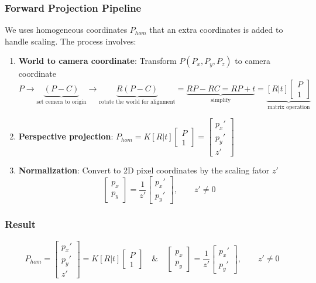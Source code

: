 \documentclass[12pt]{article}
\begin{document}
\subsubsection*{Forward Projection Pipeline}
We uses homogeneous coordinates $P_{hom}$ that an extra coordinates is added to handle scaling. The process involves:
\begin{enumerate}
    \item \textbf{World to camera coordinate}: Transform $P(P_x,P_y,P_z)$ to camera coordinate
    \[
        P \to \underbrace{(P-C)}_{\text{set cemera to origin}} \to \underbrace{R(P-C)}_{\text{rotate the world for alignment}} = \underbrace{RP-RC = RP+t}_{\text{simplify}} =\underbrace{ [R|t]\begin{bmatrix} P \\ 1 \end{bmatrix}}_{\text{matrix operation}}
    \]
    \item \textbf{Perspective projection}: \(P_{hom} = K[R|t]\begin{bmatrix} P \\ 1 \end{bmatrix} = \begin{bmatrix} p_x' \\ p_y' \\ z' \end{bmatrix}\)
    \item \textbf{Normalization}: Convert to 2D pixel coordinates by the scaling fator $z'$ \\
    \[
    \begin{bmatrix} p_x \\ p_y \end{bmatrix} = \frac{1}{z'}\begin{bmatrix} p_x' \\ p_y' \end{bmatrix}, \qquad z' \neq 0
    \]
\end{enumerate}
\subsubsection*{Result}
\[
P_{hom} = \begin{bmatrix} p_x' \\ p_y' \\ z' \end{bmatrix} = K[R|t]\begin{bmatrix} P \\ 1 \end{bmatrix} \quad \& \quad \begin{bmatrix} p_x \\ p_y \end{bmatrix} = \frac{1}{z'}\begin{bmatrix} p_x' \\ p_y' \end{bmatrix}, \qquad z' \neq 0
\]
\end{document}

